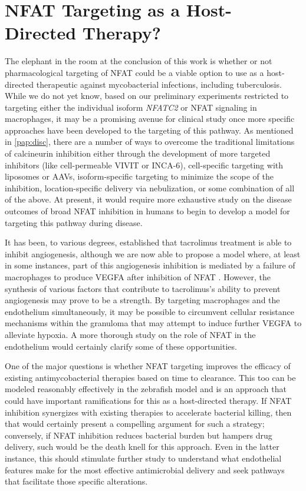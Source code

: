 \section{NFAT Targeting as a Host-Directed Therapy?}

The elephant in the room at the conclusion of this work is whether or not pharmacological targeting of NFAT could be a viable option to use as a host-directed therapeutic against mycobacterial infections, including tuberculosis. While we do not yet know, based on our preliminary experiments restricted to targeting either the individual isoform \textit{NFATC2} or NFAT signaling in macrophages, it may be a promising avenue for clinical study once more specific approaches have been developed to the targeting of this pathway. As mentioned in \autoref{pap:disc}, there are a number of ways to overcome the traditional limitations of calcineurin inhibition either through the development of more targeted inhibitors (like cell-permeable VIVIT or INCA-6), cell-specific targeting with liposomes or AAVs, isoform-specific targeting to minimize the scope of the inhibition, location-specific delivery via nebulization, or some combination of all of the above. At present, it would require more exhaustive study on the disease outcomes of broad NFAT inhibition in humans to begin to develop a model for targeting this pathway during disease.

It has been, to various degrees, established that tacrolimus treatment is able to inhibit angiogenesis, although we are now able to propose a model where, at least in some instances, part of this angiogenesis inhibition is mediated by a failure of macrophages to produce VEGFA after inhibition of NFAT \citep{Shen2022, Turgut2011}. However, the synthesis of various factors that contribute to tacrolimus's ability to prevent angiogenesis may prove to be a strength. By targeting macrophages and the endothelium simultaneously, it may be possible to circumvent cellular resistance mechanisms within the granuloma that may attempt to induce further VEGFA to alleviate hypoxia. A more thorough study on the role of NFAT in the endothelium would certainly clarify some of these opportunities. 

One of the major questions is whether NFAT targeting improves the efficacy of existing antimycobacterial therapies based on time to clearance. This too can be modeled reasonably effectively in the zebrafish model and is an approach that could have important ramifications for this as a host-directed therapy. If NFAT inhibition synergizes with existing therapies to accelerate bacterial killing, then that would certainly present a compelling argument for such a strategy; conversely, if NFAT inhibition reduces bacterial burden but hampers drug delivery, such would be the death knell for this approach. Even in the latter instance, this should stimulate further study to understand what endothelial features make for the most effective antimicrobial delivery and seek pathways that facilitate those specific alterations.

